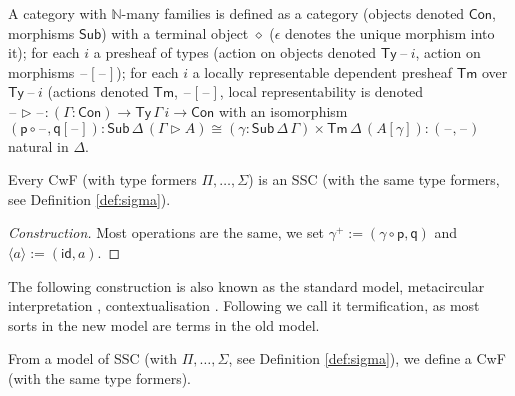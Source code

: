 \documentclass[sigplan,10pt,anonymous,review]{acmart}\settopmatter{printfolios=true,printccs=false,printacmref=false}
\newcommand{\ra}{\rightarrow}
\newcommand{\Ty}{\mathsf{Ty}}
\newcommand{\Tm}{\mathsf{Tm}}
\newcommand{\Con}{\mathsf{Con}}
\newcommand{\Sub}{\mathsf{Sub}}
\newcommand{\p}{\mathsf{p}}
\newcommand{\q}{\mathsf{q}}
\newcommand{\ext}{\mathop{\triangleright}}
\newcommand{\N}{\mathbb{N}}
\newcommand{\blank}{\mathord{\hspace{1pt}\text{--}\hspace{1pt}}} %
\newcommand{\id}{\mathsf{id}}
\begin{document}
\begin{definition}[CwF]\label{def:cwf}
  A category with $\N$-many families is defined as a category (objects
  denoted $\Con$, morphisms $\Sub$) with a terminal object $\diamond$
  ($\epsilon$ denotes the unique morphism into it); for each $i$ a
  presheaf of types (action on objects denoted $\Ty\,\blank\,i$,
  action on morphisms $\blank[\blank]$); for each $i$ a locally
  representable dependent presheaf $\Tm$ over $\Ty\,\blank\,i$
  (actions denoted $\Tm$, $\blank[\blank]$, local representability is
  denoted $\blank\ext\blank : (\Gamma:\Con)\ra\Ty\,\Gamma\,i\ra\Con$
  with an isomorphism
  $
  (\p\circ\blank,\q[\blank]) : \Sub\,\Delta\,(\Gamma\ext A) \cong (\gamma:\Sub\,\Delta\,\Gamma)\times\Tm\,\Delta\,(A[\gamma]) : (\blank,\blank)
  $
  natural in $\Delta$.
\end{definition}
\begin{problem}
  Every CwF (with type formers $\Pi, \dots, \Sigma$) is an SSC (with
  the same type formers, see Definition \ref{def:sigma}).
\end{problem}
\begin{proof}[Construction]
  Most operations are the same, we set $\gamma^+ :=
  (\gamma\circ\p,\q)$ and $\langle a\rangle := (\id,a)$.
\end{proof}
The following construction is also known as the standard model,
metacircular interpretation \cite{DBLP:conf/popl/AltenkirchK16},
contextualisation \cite{DBLP:conf/fscd/BocquetKS23}. Following
\cite{kaposi-shallow} we call it termification, as most sorts in the
new model are terms in the old model.
\begin{problem}[Termification]
  From a model of SSC (with $\Pi, \dots, \Sigma$, see Definition
  \ref{def:sigma}), we define a CwF (with the same type formers).
\end{problem}
\end{document}
